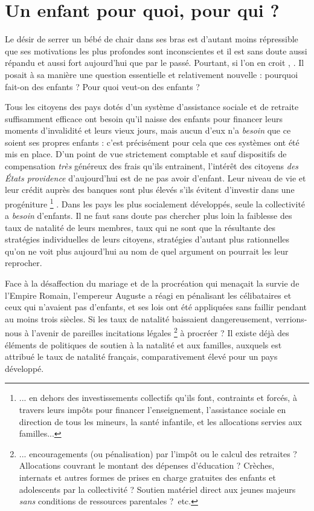   

 \chapter{Un enfant pour quoi, pour qui ?}


Le désir de serrer un bébé de chair dans ses bras est d'autant moins répressible que ses motivations les plus profondes sont inconscientes et il est sans doute aussi répandu et aussi fort aujourd'hui que par le passé. Pourtant, si l'on en croit , . Il posait à sa manière une question essentielle et relativement nouvelle : pourquoi fait-on des enfants ? Pour quoi veut-on des enfants ?


 
 Tous les citoyens des pays dotés d'un système d'assistance sociale et de retraite suffisamment efficace ont besoin qu'il naisse des enfants pour financer leurs moments d'invalidité et leurs vieux jours, mais aucun d'eux n'a \emph{besoin} que ce soient ses propres enfants : c'est précisément pour cela que ces systèmes ont été mis en place. D'un point de vue strictement comptable et sauf dispositifs de compensation \emph{très}  généreux des frais qu'ils entrainent, l'intérêt des citoyens \emph{des États providence} d'aujourd'hui est de ne pas avoir d'enfant. Leur niveau de vie et leur crédit auprès des banques sont plus élevés s'ils évitent d'investir dans une progéniture
\footnote{... en dehors des investissements collectifs qu'ils font, contraints et forcés, à travers leurs impôts pour financer l'enseignement, l'assistance sociale en direction de tous les mineurs, la santé infantile, et les allocations servies aux familles...} 
. Dans les pays les plus socialement développés, seule la collectivité a \emph{besoin} d'enfants. Il ne faut sans doute pas chercher plus loin la faiblesse des taux de natalité de leurs membres, taux qui ne sont que la résultante des stratégies individuelles de leurs citoyens, stratégies d'autant plus rationnelles qu'on ne voit plus aujourd'hui au nom de quel argument on pourrait les leur reprocher. 
 
 Face à la désaffection du mariage et de la procréation qui menaçait la survie de l'Empire Romain, l'empereur Auguste a réagi en pénalisant les célibataires et ceux qui n'avaient pas d'enfants, et ses lois ont été appliquées sans faillir pendant au moins trois siècles. Si les taux de natalité baissaient dangereusement, verrions-nous à l'avenir de pareilles incitations légales
\footnote{... encouragements (ou pénalisation) par l'impôt ou le calcul des retraites ? Allocations couvrant le montant des dépenses d'éducation ? Crèches, internats et autres formes de prises en charge gratuites des enfants et adolescents par la collectivité ? Soutien matériel direct aux jeunes majeurs \emph{sans} conditions de ressources parentales ?~etc.} 
à procréer ? Il existe déjà des éléments de politiques de soutien à la natalité et aux familles, auxquels est attribué le taux de natalité français, comparativement élevé pour un pays développé.
 

